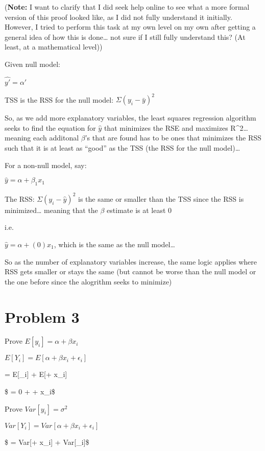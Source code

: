 \documentclass[
]{article}
\begin{document}
(\textbf{Note:} I want to clarify that I did seek help online to see
what a more formal version of this proof looked like, as I did not fully
understand it initially. However, I tried to perform this task at my own
level on my own after getting a general idea of how this is done\ldots{}
not sure if I still fully understand this? (At least, at a mathematical
level))

Given null model:

\(\hat{y'} = \alpha'\)

TSS is the RSS for the null model: \(\Sigma(y_i - \bar{y})^2\)

So, as we add more explanatory variables, the least squares regression
algorithm seeks to find the equation for \(\hat{y}\) that minimizes the
RSE and maximizes R\^{}2\ldots{} meaning each additonal \(\beta\)'s that
are found has to be ones that minimizes the RSS such that it is at least
as ``good'' as the TSS (the RSS for the null model)\ldots{}

For a non-null model, say:

\(\hat{y} = \alpha + \beta_1x_1\)

The RSS: \(\Sigma(y_i - \hat{y})^2\) is the same or smaller than the TSS
since the RSS is minimized\ldots{} meaning that the \(\beta\) estimate
is at least 0

i.e.

\(\hat{y} = \alpha + (0)x_1\), which is the same as the null
model\ldots{}

So as the number of explanatory variables increase, the same logic
applies where RSS gets smaller or stays the same (but cannot be worse
than the null model or the one before since the alogrithm seeks to
minimize)

\hypertarget{problem-3}{%
\section{Problem 3}\label{problem-3}}

Prove \(E[y_i] = \alpha + \beta x_i\)

\(E[Y_i] = E[\alpha + \beta x_i + \epsilon_i]\)

= E{[}\epsilon\_i{]} + E{[}\alpha + \beta x\_i{]}

\$ = 0 + \alpha + \beta x\_i\$

Prove \(Var[y_i] = \sigma^2\)

\(Var[Y_i] = Var[\alpha + \beta x_i + \epsilon_i]\)

\$ = Var{[}\alpha + \beta x\_i{]} + Var{[}\epsilon\_i{]}\$
\end{document}
